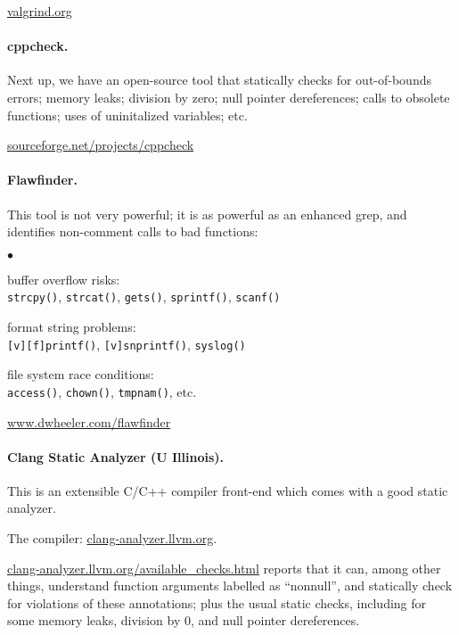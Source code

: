 \documentclass[11pt]{article}
\newcommand{\squishlist}{
 \begin{list}{$\bullet$}
  { \setlength{\itemsep}{0pt}
     \setlength{\parsep}{3pt}
     \setlength{\topsep}{3pt}
     \setlength{\partopsep}{0pt}
     \setlength{\leftmargin}{1.5em}
     \setlength{\labelwidth}{1em}
     \setlength{\labelsep}{0.5em} } }
\newcommand{\squishend}{
  \end{list}  }
\begin{document}
  \begin{center}
    \url{valgrind.org}
  \end{center}

\paragraph{cppcheck.} Next up, we have an open-source tool that statically checks for
 out-of-bounds errors;
 memory leaks;
 division by zero;
 null pointer dereferences;
 calls to obsolete functions;
 uses of uninitalized variables;
 etc.

 \begin{center}
    \url{sourceforge.net/projects/cppcheck}
  \end{center}

 \newpage
\paragraph{Flawfinder.} This tool is not very powerful; it is as powerful
as an enhanced grep, and identifies non-comment calls to bad functions:
\squishlist
    \item buffer overflow risks: \\ {\tt strcpy()}, {\tt strcat()}, {\tt gets()}, {\tt sprintf()}, {\tt scanf()}
    \item format string problems: \\
      {\tt [v][f]printf()}, {\tt [v]snprintf()}, {\tt syslog()}
    \item file system race conditions:\\
      {\tt access()}, {\tt chown()}, {\tt tmpnam()}, etc.
\squishend

\begin{center}
    \url{www.dwheeler.com/flawfinder}
  \end{center}

\paragraph{Clang Static Analyzer (U Illinois).} This is an
extensible C/C++ compiler front-end which comes with a good static analyzer.

The compiler: \url{clang-analyzer.llvm.org}.

\url{clang-analyzer.llvm.org/available_checks.html} reports that it can,
among other things, understand function arguments labelled as ``nonnull'', and statically
check for violations of these annotations; plus the usual static checks, including for
some memory leaks, division by 0, and null pointer dereferences.
\end{document}
